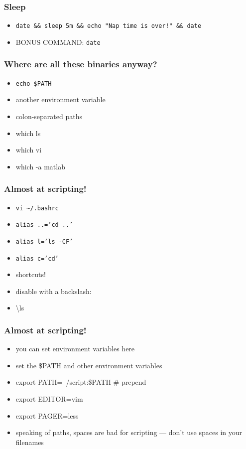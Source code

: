 \documentclass[%
        hyperref={%
                pdfauthor={Zakariyya Mughal},%
                pdfpagemode={None},pdfpagelayout={SinglePage}}%
        xcolor={x11names},%
]{beamer}
\begin{document}
\begin{frame}
	\frametitle{Sleep}
	\begin{itemize}
		\item \texttt{date \&\& sleep 5m \&\& echo "Nap
		time is over!" \&\& date }
		\pause\item BONUS COMMAND: \texttt{date}
	\end{itemize}
\end{frame}
\begin{frame}
	\frametitle{Where are all these binaries anyway?}
	\begin{itemize}
		\item \texttt{echo \$PATH}
		\item another environment variable
		\pause\item colon-separated paths
		\item which ls
		\item which vi
		\item which -a matlab
	\end{itemize}
\end{frame}
\begin{frame}
	\frametitle{Almost at scripting!}
	\begin{itemize}
		\item \texttt{vi \textasciitilde/.bashrc}
		\item \texttt{alias ..='cd ..'}
		\item \texttt{alias l='ls -CF'}
		\item \texttt{alias c='cd'}
		\item shortcuts!
		\pause\item disable with a backslash:
		\item \textbackslash{}ls
	\end{itemize}
\end{frame}
\begin{frame}
	\frametitle{Almost at scripting!}
	\begin{itemize}
		\item you can set environment variables here
		\item set the \$PATH and other environment variables
		\item export PATH=~/script:\$PATH \# prepend
		\item export EDITOR=vim
		\item export PAGER=less
		\pause\item speaking of paths, spaces are bad for scripting --- don't use spaces in your filenames
	\end{itemize}
\end{frame}
\end{document}
